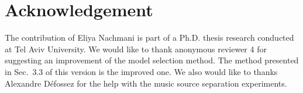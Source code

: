 \documentclass{article}
\begin{document}
\section*{Acknowledgement} 
The contribution of Eliya Nachmani is part of a Ph.D. thesis research conducted
at Tel Aviv University. We would like to thank anonymous reviewer 4 for suggesting an improvement of the model selection method. The method presented in Sec.~3.3 of this version is the improved one. We also would like to thanks Alexandre D\'efossez for the help with the music source separation experiments.

\clearpage


\end{document}
